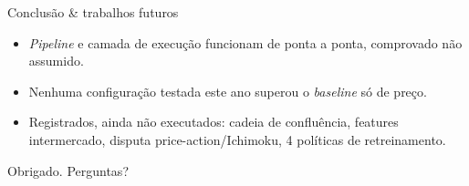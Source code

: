 \documentclass[aspectratio=169,17pt]{beamer}
\begin{document}
\begin{frame}{Conclusão \& trabalhos futuros}
  \begin{itemize}
    \item \textit{Pipeline} e camada de execução funcionam de ponta a ponta, comprovado não assumido.
    \item Nenhuma configuração testada este ano superou o \textit{baseline} só de preço.
    \item Registrados, ainda não executados: cadeia de confluência, features intermercado, disputa price-action/Ichimoku, 4 políticas de retreinamento.
  \end{itemize}
\end{frame}

\begin{frame}
  \centering
  {\Large Obrigado. Perguntas?}
\end{frame}
\end{document}
